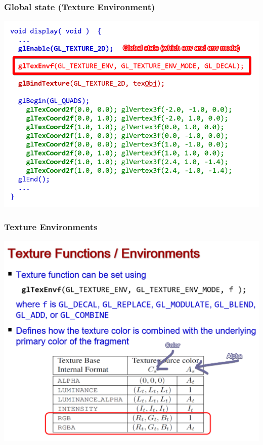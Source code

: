 \documentclass{beamer}
\begin{document}
\begin{frame}
    \frametitle{Global state (Texture Environment)}

    \begin{center}
        \includegraphics[scale=0.5]{global-vars.png}
    \end{center}

\end{frame}

\begin{frame}
    \frametitle{Texture Environments}

    \begin{center}
        \includegraphics[scale=0.5]{texenv.png}
    \end{center}

\end{frame}
\end{document}
